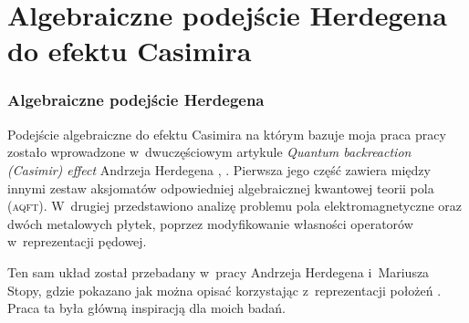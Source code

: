 \documentclass[10pt,t]{beamer}
\begin{document}











\section{Algebraiczne podejście Herdegena do efektu Casimira}



\begin{frame}
  \frametitle{Algebraiczne podejście Herdegena}


  Podejście algebraiczne do efektu Casimira na którym bazuje moja praca
  pracy zostało wprowadzone w~dwuczęściowym artykule
  \textit{Quantum backreaction (Casimir) effect} Andrzeja Herdegena
  \parencite{Herdegen-Quantum-backreaction-ETC-Part-I-Pub-2005},
  \parencite{Herdegen-Quantum-backreaction-ETC-Part-II-Pub-2006}.
  Pierwsza jego część zawiera między innymi zestaw aksjomatów odpowiedniej
  algebraicznej kwantowej teorii pola (\textsc{aqft}). W~drugiej
  przedstawiono analizę problemu pola elektromagnetyczne oraz
  dwóch metalowych płytek, poprzez modyfikowanie własności operatorów
  w~reprezentacji pędowej.

  Ten sam układ został przebadany w~pracy Andrzeja Herdegena i~Mariusza
  Stopy, gdzie pokazano jak można opisać korzystając z~reprezentacji
  położeń \parencite{Herdegen-Stopa-Global-vs-local-ETC-2010}. Praca ta była
  główną inspiracją dla moich badań.

\end{frame}
\end{document}
